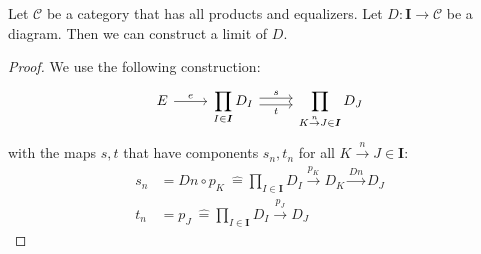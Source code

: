 \begin{theorem}
  \label{arbitrarylimits}
  Let $\mathscr C$ be a category that has all products and equalizers.
  Let $D : \bm I \to \mathscr C$ be a diagram.
  Then we can construct a limit of $D$.
\end{theorem}
\begin{proof}
We use the following construction:
\[
  \begin{tikzcd}
    E \arrow{r}{e} &
    \displaystyle \prod_{I \in \bm{I}} D_I
    \arrow[r,shift left, "s"] \arrow[r,shift right,swap,"t"] &
    \displaystyle \prod_{K \overset{n}{\to} J \in \bm{I}} D_J
  \end{tikzcd}
\]
with the maps $s, t$ that have components $s_n, t_n$ for all $K \overset{n}{\to} J \in \bm{I}$:
\begin{align*}
  s_n &= Dn \circ p_K\ \hat{=} \prod_{I \in \bm{I}} D_I
        \overset{p_K}{\rightarrow} D_K \overset{Dn}{\rightarrow} D_J \\
  t_n &= p_J\ \hat{=} \prod_{I \in \bm{I}} D_I
        \overset{p_J}{\rightarrow} D_J
\end{align*}


\end{proof}
